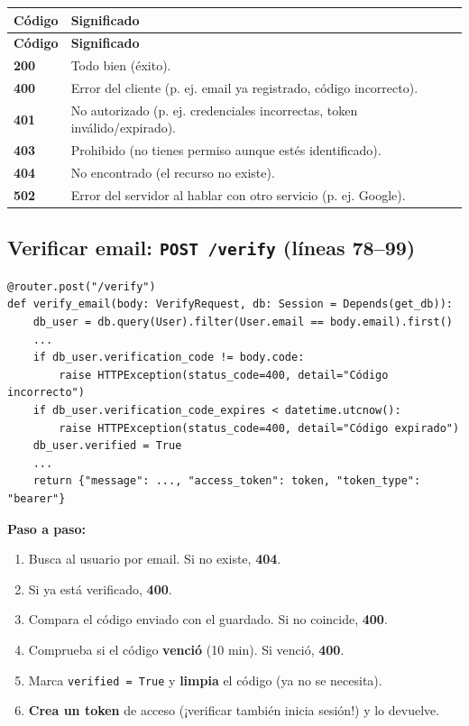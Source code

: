 \documentclass[11pt,a4paper]{article}
\begin{document}
\begin{center}
{\small
\setlength{\tabcolsep}{4pt}
\begin{longtable}{@{}>{\raggedright\arraybackslash}p{2.5cm}>{\raggedright\arraybackslash}p{12.4cm}@{}}
\toprule
\textbf{Código} & \textbf{Significado} \\
\midrule
\endfirsthead
\toprule
\textbf{Código} & \textbf{Significado} \\
\midrule
\endhead
\textbf{200} & Todo bien (éxito). \\
\textbf{400} & Error del cliente (p. ej. email ya registrado, código incorrecto). \\
\textbf{401} & No autorizado (p. ej. credenciales incorrectas, token inválido/expirado). \\
\textbf{403} & Prohibido (no tienes permiso aunque estés identificado). \\
\textbf{404} & No encontrado (el recurso no existe). \\
\textbf{502} & Error del servidor al hablar con otro servicio (p. ej. Google). \\
\bottomrule
\end{longtable}
}
\end{center}

\subsection{Verificar email: \texttt{POST /verify} (líneas 78--99)}

\begin{lstlisting}
@router.post("/verify")
def verify_email(body: VerifyRequest, db: Session = Depends(get_db)):
    db_user = db.query(User).filter(User.email == body.email).first()
    ...
    if db_user.verification_code != body.code:
        raise HTTPException(status_code=400, detail="Código incorrecto")
    if db_user.verification_code_expires < datetime.utcnow():
        raise HTTPException(status_code=400, detail="Código expirado")
    db_user.verified = True
    ...
    return {"message": ..., "access_token": token, "token_type": "bearer"}
\end{lstlisting}

\textbf{Paso a paso:}
\begin{enumerate}
    \item Busca al usuario por email. Si no existe, \textbf{404}.
    \item Si ya está verificado, \textbf{400}.
    \item Compara el código enviado con el guardado. Si no coincide, \textbf{400}.
    \item Comprueba si el código \textbf{venció} (10 min). Si venció, \textbf{400}.
    \item Marca \texttt{verified = True} y \textbf{limpia} el código (ya no se necesita).
    \item \textbf{Crea un token} de acceso (¡verificar también inicia sesión!) y lo devuelve.
\end{enumerate}
\end{document}
